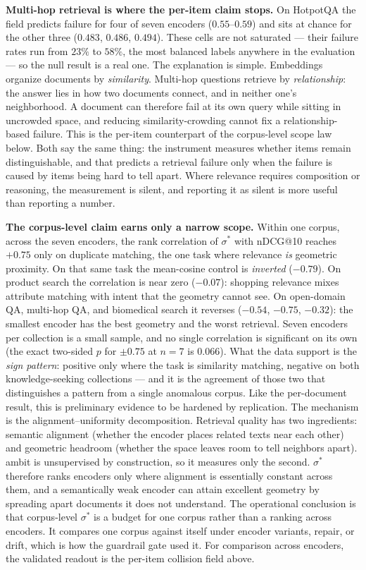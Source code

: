 \documentclass[11pt,letterpaper]{article}
\newcommand{\sstar}{\sigma^{*}}
\begin{document}
\textbf{Multi-hop retrieval is where the per-item claim stops.} On
HotpotQA the field predicts failure for four of seven encoders
($0.55$--$0.59$) and sits at chance for the other three ($0.483$, $0.486$,
$0.494$). These cells are not saturated --- their failure rates run from
$23\%$ to $58\%$, the most balanced labels anywhere in the evaluation --- so the
null result is a real one. The explanation is simple. Embeddings
organize documents by \emph{similarity}. Multi-hop questions retrieve by
\emph{relationship}: the answer lies in how two documents connect, and
in neither one's neighborhood. A document can therefore fail at its own
query while sitting in uncrowded space, and reducing similarity-crowding
cannot fix a relationship-based failure. This is the per-item counterpart of the corpus-level scope law
below. Both say the same thing: the instrument measures whether items
remain distinguishable, and that predicts a retrieval failure only when
the failure is caused by items being hard to tell apart. Where relevance
requires composition or reasoning, the measurement is silent, and
reporting it as silent is more useful than reporting a number.

\textbf{The corpus-level claim earns only a narrow scope.} Within one
corpus, across the seven encoders, the rank correlation of $\sstar$ with
nDCG@10 reaches $+0.75$ only on duplicate matching, the one task where
relevance \emph{is} geometric proximity. On that same task the mean-cosine
control is \emph{inverted} ($-0.79$). On product search the correlation is
near zero ($-0.07$): shopping relevance mixes attribute matching with
intent that the geometry cannot see. On open-domain QA, multi-hop QA, and biomedical search it reverses
($-0.54$, $-0.75$, $-0.32$): the smallest encoder has the best geometry
and the worst retrieval. Seven encoders per collection is a small
sample, and no single correlation is significant on its own (the exact
two-sided $p$ for $\pm 0.75$ at $n = 7$ is $0.066$). What the data
support is the \emph{sign pattern}: positive only where the task is
similarity matching, negative on both knowledge-seeking collections ---
and it is the agreement of those two that distinguishes a pattern from
a single anomalous corpus. Like the per-document result, this is
preliminary evidence to be hardened by replication. The mechanism is the alignment--uniformity
decomposition. Retrieval quality has two ingredients: semantic alignment
(whether the encoder places related texts near each other) and geometric
headroom (whether the space leaves room to tell neighbors apart).
\textsf{ambit} is unsupervised by construction, so it measures only the
second. $\sstar$ therefore ranks encoders only where alignment is
essentially constant across them, and a semantically weak encoder can
attain excellent geometry by spreading apart documents it does not
understand. The operational conclusion is that corpus-level $\sstar$ is a
budget for one corpus rather than a ranking across encoders. It compares
one corpus against itself under encoder variants, repair, or drift, which
is how the guardrail gate used it. For comparison across encoders, the
validated readout is the per-item collision field above.
\end{document}
